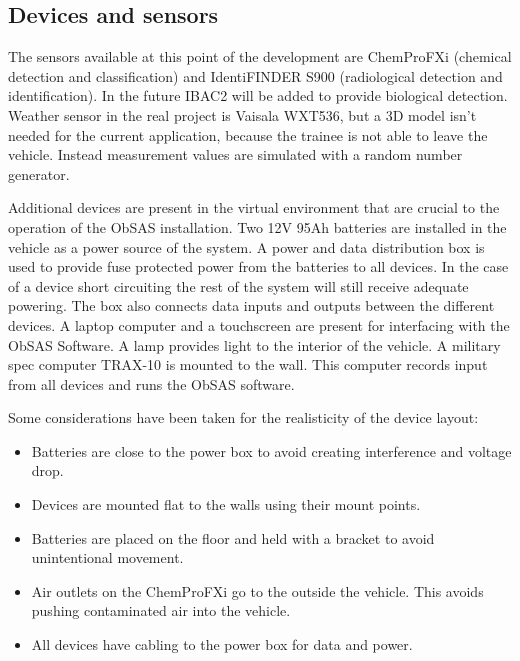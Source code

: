 \documentclass[12pt, a4paper,oneside, nocenter]{thesis}
\begin{document}
\subsection{Devices and sensors}
The sensors available at this point of the development are ChemProFXi (chemical detection and classification) and IdentiFINDER S900 (radiological detection and identification). In the future IBAC2 will be added to provide biological detection. Weather sensor in the real project is Vaisala WXT536, but a 3D model isn't needed for the current application, because the trainee is not able to leave the vehicle. Instead measurement values are simulated with a random number generator.
\par
Additional devices are present in the virtual environment that are crucial to the operation of the ObSAS installation. Two 12V 95Ah batteries are installed in the vehicle as a power source of the system. A power and data distribution box is used to provide fuse protected power from the batteries to all devices. In the case of a device short circuiting the rest of the system will still receive adequate powering. The box also connects data inputs and outputs between the different devices. A laptop computer and a touchscreen are present for interfacing with the ObSAS Software. A lamp provides light to the interior of the vehicle. A military spec computer TRAX-10 is mounted to the wall. This computer records input from all devices and runs the ObSAS software.
\par
Some considerations have been taken for the realisticity of the device layout:
\begin{itemize}
  \item Batteries are close to the power box to avoid creating interference and voltage drop.
  \item Devices are mounted flat to the walls using their mount points.
  \item Batteries are placed on the floor and held with a bracket to avoid unintentional movement.
  \item Air outlets on the ChemProFXi go to the outside the vehicle. This avoids pushing contaminated air into the vehicle.
  \item All devices have cabling to the power box for data and power.
\end{itemize}
\end{document}
